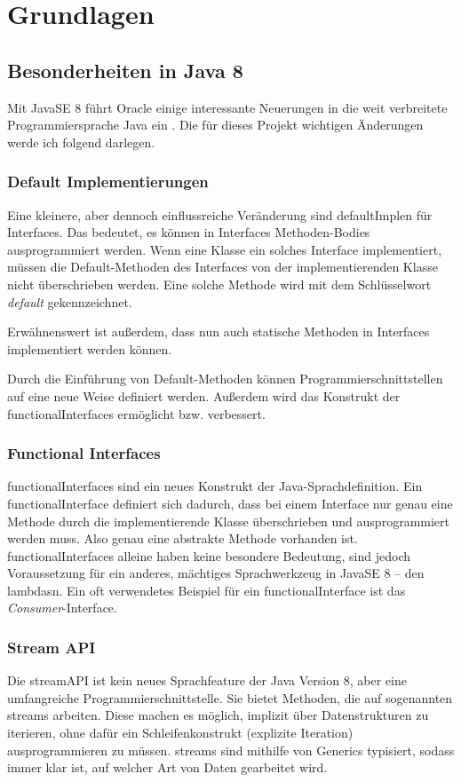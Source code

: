
\chapter{Grundlagen}
\section{Besonderheiten in Java 8} \label{sec:grundJava8}
Mit JavaSE 8 führt Oracle einige interessante Neuerungen in die weit verbreitete Programmiersprache Java ein \cite[S. 35]{Ullenboom2014}. Die für dieses Projekt wichtigen Änderungen werde ich folgend darlegen.
\subsection{Default Implementierungen} \label{sec:javaDefault}
Eine kleinere, aber dennoch einflussreiche Veränderung sind \gls{defaultImpl}en für Interfaces. Das bedeutet, es können in Interfaces Methoden-Bodies ausprogrammiert werden. Wenn eine Klasse ein solches Interface implementiert, müssen die Default-Methoden des Interfaces von der implementierenden Klasse nicht überschrieben werden. Eine solche Methode wird mit dem Schlüsselwort \textit{default} gekennzeichnet. \cite[S. 45f.]{Ullenboom2014}

Erwähnenswert ist außerdem, dass nun auch statische Methoden in Interfaces implementiert werden können. \cite[S. 48f.]{Ullenboom2014}

Durch die Einführung von Default-Methoden können Programmierschnittstellen auf eine neue Weise definiert werden. Außerdem wird das Konstrukt der \gls{functionalInterface}s ermöglicht bzw. verbessert.
\subsection{Functional Interfaces} \label{sec:javaFunctional}
\gls{functionalInterface}s sind ein neues Konstrukt der Java-Sprachdefinition. Ein \gls{functionalInterface} definiert sich dadurch, dass bei einem Interface nur genau eine Methode durch die implementierende Klasse überschrieben und ausprogrammiert werden muss. Also genau eine abstrakte Methode vorhanden ist. \gls{functionalInterface}s alleine haben keine besondere Bedeutung, sind jedoch Voraussetzung für ein anderes, mächtiges Sprachwerkzeug in JavaSE 8 – den \glspl{lambda}n. Ein oft verwendetes Beispiel für ein \gls{functionalInterface} ist das \textit{Consumer}-Interface. \cite[S. 63f.]{Ullenboom2014}
\subsection{Stream API} \label{sec:javaStream}
Die \gls{streamAPI} ist kein neues Sprachfeature der Java Version 8, aber eine umfangreiche Programmierschnittstelle. Sie bietet Methoden, die auf sogenannten \gls{stream}s arbeiten. Diese machen es möglich, implizit über Datenstrukturen zu iterieren, ohne dafür ein Schleifenkonstrukt (explizite Iteration) ausprogrammieren zu müssen. \gls{stream}s sind mithilfe von Generics typisiert, sodass immer klar ist, auf welcher Art von Daten gearbeitet wird. \cite[S. 391f.]{Ullenboom2014}

